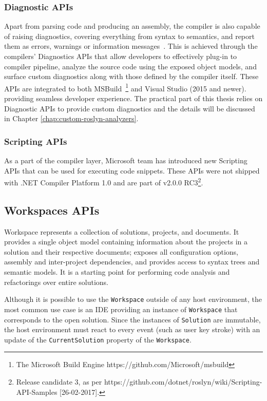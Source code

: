 \documentclass[
  digital, %
  table,   %
  lof,     %
  lot,     %
  oneside,
]{fithesis3}
\begin{document}
\subsubsection{Diagnostic APIs}
Apart from parsing code and producing an assembly, the compiler is also capable of raising diagnostics, covering everything from syntax to semantics, and report them as errors, warnings or information messages~\cite{roslyn-succinctly}. This is achieved through the compilers' Diagnostics APIs that allow developers to effectively plug-in to compiler pipeline, analyze the source code using the exposed object models, and surface custom diagnostics along with those defined by the compiler itself. These APIs are integrated to both MSBuild~\footnote{The Microsoft Build Engine https://github.com/Microsoft/msbuild} and Visual Studio (2015 and newer). providing seamless developer experience. The practical part of this thesis relies on Diagnostic APIs to provide custom diagnostics and the details will be discussed in Chapter \ref{chap:custom-roslyn-analyzers}.

\subsubsection{Scripting APIs}
As a part of the compiler layer, Microsoft team has introduced new Scripting APIs that can be used for executing code snippets. These APIs were not shipped with .NET Compiler Platform 1.0 and are part of v2.0.0 RC3\footnote{Release candidate 3, as per https://github.com/dotnet/roslyn/wiki/Scripting-API-Samples [26-02-2017].}.

\subsection{Workspaces APIs}
Workspace represents a collection of solutions, projects, and documents. It provides a single object model containing information about the projects in a solution and their respective documents; exposes all configuration options, assembly and inter-project dependencies, and provides access to syntax trees and semantic models. It is a starting point for performing code analysis and refactorings over entire solutions.

Although it is possible to use the \texttt{Workspace} outside of any host environment, the most common use case is an IDE providing an instance of \texttt{Workspace} that corresponds to the open solution. Since the instances of \texttt{Solution} are immutable, the host environment must react to every event (such as user key stroke) with an update of the \texttt{CurrentSolution} property of the \texttt{Workspace}.
\end{document}
